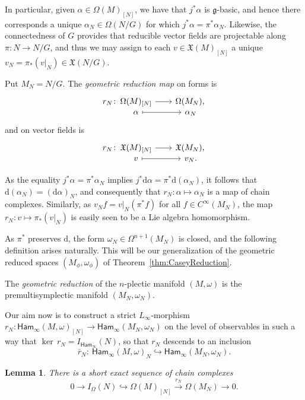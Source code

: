 \documentclass[10pt,a4paper]{amsart}
\numberwithin{equation}{section}
\newtheorem{Lemma}[Theorem]{Lemma}
\newcommand{\g}{\mathfrak{g}}
\newcommand{\Ham}{\mathsf{Ham}}
\newcommand{\X}{\mathfrak{X}}
\renewcommand{\d}{\mathrm{d}}
\newcommand{\morphism}[5]{%
  \begin{tikzcd}[
    column sep=2em,
    row sep=-.5ex,
    ampersand replacement=\&
  ]
  #1\colon~ \&[-3em]
  #2\vphantom{#3} \arrow[r] \&
  #3\vphantom{#2} \\
  \&
  #4\vphantom{#5} \arrow[r,mapsto] \&
  #5\vphantom{#4}
  \end{tikzcd}%
}
\begin{document}
In particular, given $\alpha\in\Omega(M)_{[N]}$, we have that $j^\ast \alpha$ is $\g$-basic, and hence there corresponds a unique $\alpha_N\in\Omega(N/G)$ for which $j^*\alpha=\pi^*\alpha_N$.
Likewise, the connectedness of $G$ provides that reducible vector fields are projectable along $\pi\colon N\to N/G$, and thus we may assign to each $v\in\X(M)_{[N]}$ a unique $v_N=\pi_*(v|_N)\in\X(N/G)$.

\begin{Definition}\label{def:geometric_reduction_map}
	Put $M_N=N/G$. The \emph{geometric reduction map} on forms is
	\begin{displaymath}
		\morphism{r_N}
		{\Omega(M)_{[N]}	}{\Omega(M_N),}
		{\alpha}{\alpha_N}
	\end{displaymath}
	and on vector fields is
	\begin{displaymath}
		\morphism{r_N}
		{\X(M)_{[N]}	}{\X(M_N),}
		{v}{v_N.}
	\end{displaymath}
\end{Definition}

\begin{Remark}
	As the equality $j^*\alpha=\pi^*\alpha_N$ implies $j^*\d\alpha = \pi^*\d(\alpha_N)$, it follows that $\d(\alpha_N)=(\d\alpha)_N$, and consequently that $r_N\colon \alpha\mapsto\alpha_N$ is a map of chain complexes. Similarly, as $v_N f = v|_N (\pi^*f)$ for all $f\in C^\infty(M_N)$, the map $r_N\colon v\mapsto \pi_*(v|_N)$ is easily seen to be a Lie algebra homomorphism.
\end{Remark}

As $\pi^*$ preserves $\d$, the form $\omega_N\in\Omega^{n+1}(M_N)$ is closed, and the following definition arises naturally. This will be our generalization of the geometric reduced spaces $(M_\phi,\omega_\phi)$ of Theorem~\ref{thm:CaseyReduction}.

\begin{Definition}\label{def:geometric_reduction}
	The \emph{geometric reduction} of the $n$-plectic manifold $(M,\omega)$ is the premultisymplectic manifold $(M_N,\omega_N)$.
\end{Definition}

Our aim now is to construct a strict $L_\infty$-morphism $r_N\colon \Ham_\infty(M,\omega)_{[N]}\to \Ham_\infty(M_N,\omega_N)$ on the level of observables in such a way that $\ker\,r_N=I_{\Ham_\infty}(N)$, so that $r_N$ descends to an inclusion
\[
	\bar{r}_N\colon \ \Ham_\infty(M,\omega)_N \hookrightarrow \Ham_\infty(M_N,\omega_N).
\]

\begin{Lemma}\label{lem:SesReducibleForms}
	There is a short exact sequence of chain complexes
	\[
		0\to I_\Omega(N)\hookrightarrow\Omega(M)_{[N]}\xrightarrow{r_N}  \Omega(M_N)\to 0.
	\]
\end{Lemma}
\end{document}
